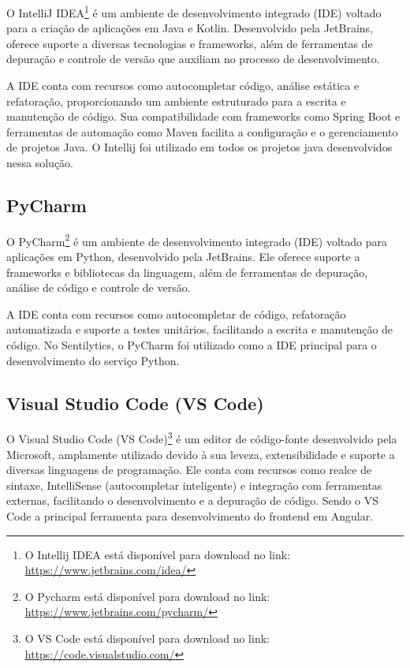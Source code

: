 \documentclass[
	12pt,				%
	oneside,			%
	a4paper,			%
	english,			%
	french,				%
	spanish,			%
	brazil				%
	]{abntex2}
\begin{document}
O IntelliJ IDEA\footnote{O Intellij IDEA está disponível para download
  no link: \url{https://www.jetbrains.com/idea/}} é um ambiente de
desenvolvimento integrado (IDE) voltado para a criação de aplicações em
Java e Kotlin. Desenvolvido pela JetBrains, oferece suporte a diversas
tecnologias e frameworks, além de ferramentas de depuração e controle de
versão que auxiliam no processo de desenvolvimento.

A IDE conta com recursos como autocompletar código, análise estática e
refatoração, proporcionando um ambiente estruturado para a escrita e
manutenção de código. Sua compatibilidade com frameworks como Spring
Boot e ferramentas de automação como Maven facilita a configuração e o
gerenciamento de projetos Java. O Intellij foi utilizado em todos os
projetos java desenvolvidos nessa solução.

\hypertarget{pycharm}{%
\subsection{PyCharm}\label{pycharm}}

O PyCharm\footnote{O Pycharm está disponível para download no link:
  \url{https://www.jetbrains.com/pycharm/}} é um ambiente de
desenvolvimento integrado (IDE) voltado para aplicações em Python,
desenvolvido pela JetBrains. Ele oferece suporte a frameworks e
bibliotecas da linguagem, além de ferramentas de depuração, análise de
código e controle de versão.

A IDE conta com recursos como autocompletar de código, refatoração
automatizada e suporte a testes unitários, facilitando a escrita e
manutenção de código. No Sentilytics, o PyCharm foi utilizado como a IDE
principal para o desenvolvimento do serviço Python.

\hypertarget{visual-studio-code-vs-code}{%
\subsection{Visual Studio Code (VS
Code)}\label{visual-studio-code-vs-code}}

O Visual Studio Code (VS Code)\footnote{O VS Code está disponível para
  download no link: \url{https://code.visualstudio.com/}} é um editor de
código-fonte desenvolvido pela Microsoft, amplamente utilizado devido à
sua leveza, extensibilidade e suporte a diversas linguagens de
programação. Ele conta com recursos como realce de sintaxe, IntelliSense
(autocompletar inteligente) e integração com ferramentas externas,
facilitando o desenvolvimento e a depuração de código. Sendo o VS Code a
principal ferramenta para desenvolvimento do frontend em Angular.
\end{document}
